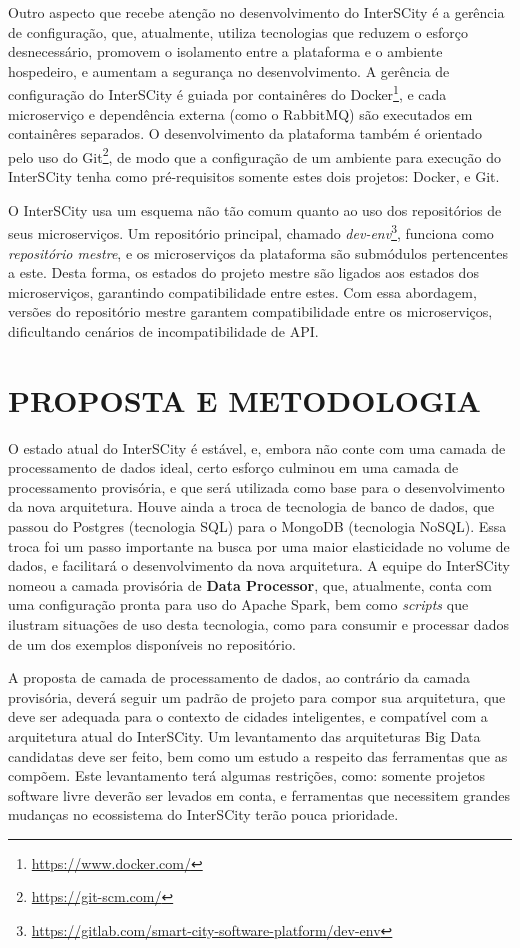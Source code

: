 Outro aspecto que recebe atenção no desenvolvimento do InterSCity é a gerência
de configuração, que, atualmente, utiliza tecnologias que reduzem o esforço
desnecessário, promovem o isolamento entre a plataforma e o ambiente hospedeiro,
e aumentam a segurança no desenvolvimento. A gerência de configuração do
InterSCity é guiada por containêres do
Docker\footnote{\url{https://www.docker.com/}}, e cada microserviço e
dependência externa (como o RabbitMQ) são executados em
containêres separados. O desenvolvimento da plataforma também é
orientado pelo uso do Git\footnote{\url{https://git-scm.com/}}, de modo que a
configuração de um ambiente para execução do InterSCity tenha como
pré-requisitos somente estes dois projetos: Docker, e Git.

O InterSCity usa um esquema não tão comum quanto ao uso dos repositórios de
seus microserviços. Um repositório principal, chamado
\textit{dev-env}\footnote{\url{https://gitlab.com/smart-city-software-platform/dev-env}},
funciona como \textit{repositório mestre}, e os microserviços da plataforma são
submódulos pertencentes a este. Desta forma, os estados do projeto mestre são
ligados aos estados dos microserviços, garantindo compatibilidade entre estes.
Com essa abordagem, versões do repositório mestre garantem compatibilidade
entre os microserviços, dificultando cenários de incompatibilidade de API.

\section{PROPOSTA E METODOLOGIA}

O estado atual do InterSCity é estável, e, embora não conte com uma camada de
processamento de dados ideal, certo esforço culminou em uma camada de
processamento provisória, e que será utilizada como base para o desenvolvimento
da nova arquitetura. Houve ainda a troca de tecnologia de banco de dados, que
passou do Postgres (tecnologia SQL) para o MongoDB (tecnologia NoSQL). Essa
troca foi um passo importante na busca por uma maior elasticidade no volume de
dados, e facilitará o desenvolvimento da nova arquitetura. A equipe do
InterSCity nomeou a camada provisória de \textbf{Data Processor}, que,
atualmente, conta com uma configuração pronta para uso do Apache Spark, bem
como \textit{scripts} que ilustram situações de uso desta tecnologia, como
para consumir e processar dados de um dos exemplos disponíveis no
repositório.

A proposta de camada de processamento de dados, ao contrário da camada
provisória, deverá seguir um padrão de projeto para compor sua arquitetura, que
deve ser adequada para o contexto de cidades inteligentes, e compatível com a
arquitetura atual do InterSCity. Um levantamento das arquiteturas Big Data
candidatas deve ser feito, bem como um estudo a respeito das ferramentas que
as compõem. Este levantamento terá algumas restrições, como: somente projetos
software livre deverão ser levados em conta, e ferramentas que necessitem
grandes mudanças no ecossistema do InterSCity terão pouca prioridade.

